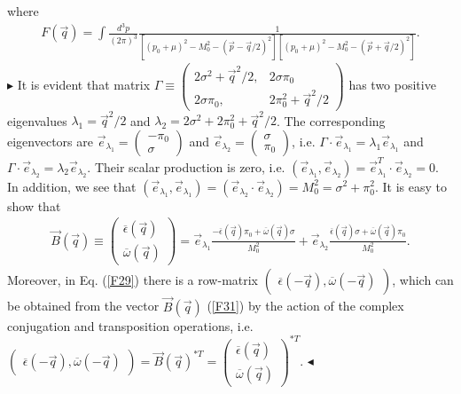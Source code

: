 \documentclass[12pt,a4paper]{article}
\begin{document}
where
\begin{eqnarray}
F(\vec q)=\int \frac{d^3p}{(2\pi)^3}\frac{1}{[(p_0+\mu)^2-M_0^2-(\vec p-\vec q/2)^2][(p_0+\mu)^2-M_0^2-(\vec p+\vec q/2)^2]}.
\label{F30}
\end{eqnarray}
$\blacktriangleright$ It is evident that matrix $\Gamma\equiv\left (\begin{array}{cc}
2\sigma^2+
\vec q^2/2,& 2\sigma\pi_0\\
2\sigma\pi_0,& 2\pi_0^2+\vec q^2/2
\end{array}\right )$ has two positive eigenvalues $\lambda_1=\vec q^2/2$ and $\lambda_2=2\sigma^2+2\pi_0^2+ \vec q^2/2$. The corresponding eigenvectors are $\vec e_{\lambda_1}=\left(\begin{array}{cc}
-\pi_0\\ \sigma
\end{array}\right )$ and $\vec e_{\lambda_2}=\left(\begin{array}{cc}
\sigma\\ \pi_0
\end{array}\right )$, i.e. $\Gamma\cdot\vec e_{\lambda_1}=\lambda_1\vec e_{\lambda_1}$ and $\Gamma\cdot\vec e_{\lambda_2}=\lambda_2\vec e_{\lambda_2}$. Their scalar production is zero, i.e. $(\vec e_{\lambda_1},\vec e_{\lambda_2})=\vec e^T_{\lambda_1}\cdot \vec e_{\lambda_2}=0.$ In addition, we see that $(\vec e_{\lambda_1},\vec e_{\lambda_1})=(\vec e_{\lambda_2}\cdot \vec e_{\lambda_2})=M_0^2=\sigma^2+\pi_0^2.$ It is easy to show that
\begin{eqnarray}
\vec B(\vec q)\equiv \left (\begin{array}{cc}
\overline \epsilon (\vec q)\\
\overline \omega (\vec q)
\end{array}\right )=\vec e_{\lambda_1}\frac{-\overline \epsilon (\vec q)\pi_0+\overline \omega (\vec q)\sigma}{M_0^2}+\vec e_{\lambda_2}\frac{\overline \epsilon (\vec q)\sigma+\overline \omega (\vec q)\pi_0}{M_0^2}.\label{F31}
\end{eqnarray}
Moreover, in Eq. (\ref{F29}) there is a row-matrix $\left (\begin{array}{c}
\overline \epsilon (-\vec q),
\overline \omega (-\vec q)
\end{array}\right )$, which can be obtained from the vector $\vec B(\vec q)$ (\ref{F31})
by the action of the complex conjugation and transposition operations, i.e. $\left (\begin{array}{c}
\overline \epsilon (-\vec q),
\overline \omega (-\vec q)
\end{array}\right )=\vec B(\vec q)^{*T}=\left (\begin{array}{cc}
\overline \epsilon (\vec q)\\
\overline \omega (\vec q)
\end{array}\right )^{*T}$. $\blacktriangleleft$
\end{document}
